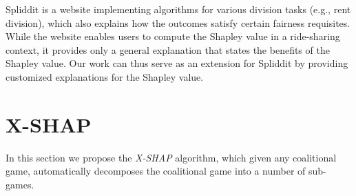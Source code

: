 \documentclass[letterpaper]{article} %
\begin{document}

Spliddit \cite{Goldman14spliddit:unleashing} is a website implementing algorithms for various division tasks (e.g., rent division), which also explains how the outcomes satisfy certain fairness requisites.
While the website enables users to compute the Shapley value in a ride-sharing context, it provides only a general explanation that states the benefits of the Shapley value. 
Our work can thus serve as an extension for Spliddit by providing customized explanations for the Shapley value.






\section{X-SHAP}
In this section we propose the \textit{X-SHAP} algorithm, %
which given any coalitional game, automatically decomposes the coalitional game into a number of sub-games. %
\end{document}
